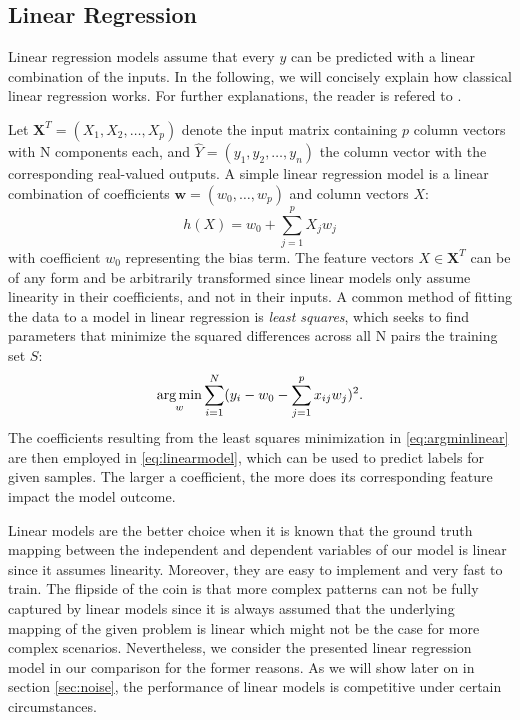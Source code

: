 \subsection{Linear Regression}

Linear regression models assume that every $ y $ can be predicted with a linear combination of the inputs. In the following, we will concisely explain how classical linear regression works. For further explanations, the reader is refered to \cite{friedman2001elements}.

Let $ \textbf{X}^{T} = (X_1, X_2, \dots, X_p) $ denote the input matrix containing $ p $ column vectors with N components each, and $ \hat{Y} = (y_1, y_2, \dots, y_n)$ the column vector with the corresponding real-valued outputs. A simple linear regression model is a linear combination of coefficients $ \mathbf{w} = (w_0, \dots, w_p) $ and column vectors $ X $:
\begin{equation}\label{eq:linearmodel}
h(X) = w_0 + \sum_{j=1}^{p} X_jw_j
\end{equation}
with coefficient $ w_0 $ representing the bias term. The feature vectors $ X \in \textbf{X}^{T} $ can be of any form and be arbitrarily transformed since linear models only assume linearity in their coefficients, and not in their inputs.
A common method of fitting the data to a model in linear regression is \textit{least squares}, which seeks to find parameters that minimize the squared differences across all N pairs the training set $ S $:
\begin{equation}\label{eq:argminlinear}
\operatorname*{arg\,min}_{w} \sum_{i=1}^{N}(y_i - w_0 - \sum_{j=1}^{p} x_{ij}w_j)^2. 
\end{equation}
The coefficients resulting from the least squares minimization in \ref{eq:argminlinear} are then employed in \ref{eq:linearmodel}, which can be used to predict labels for given samples. The larger a coefficient, the more does its corresponding feature impact the model outcome. 

Linear models are the better choice when it is known that the ground truth mapping between the independent and dependent variables of our model is linear since it assumes linearity. Moreover, they are easy to implement and very fast to train. The flipside of the coin is that more complex patterns can not be fully captured by linear models since it is always assumed that the underlying mapping of the given problem is linear which might not be the case for more complex scenarios. Nevertheless, we consider the presented linear regression model in our comparison for the former reasons. As we will  show later on in section \ref{sec:noise}, the performance of linear models is competitive under certain circumstances.

